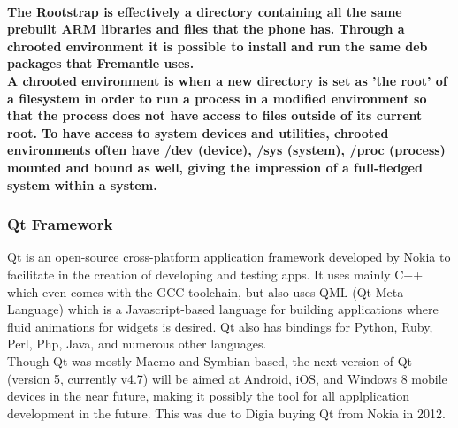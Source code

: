 \documentclass[11pt]{article} %
\begin{document}
\paragraph{The Rootstrap is effectively a directory containing all the same prebuilt ARM libraries and files that the phone has. Through a chrooted environment it is possible to install and run the same deb packages that Fremantle uses. \\A chrooted environment is when a new directory is set as 'the root' of a filesystem in order to run a process in a modified environment so that the process does not have access to files outside of its current root. To have access to system devices and utilities, chrooted environments often have  /dev (device), /sys (system), /proc (process) mounted and bound as well, giving the impression of a full-fledged system within a system.}

\subsubsection{Qt Framework} {
Qt is an open-source cross-platform application framework developed by Nokia to facilitate in the creation of developing and testing apps.  It uses mainly C++ which even comes with the GCC toolchain, but also uses QML (Qt Meta Language) which is a Javascript-based language for building applications where fluid animations for widgets is desired. Qt also has bindings for Python, Ruby, Perl, Php, Java, and numerous other languages.\\

Though Qt was mostly Maemo and Symbian based, the next version of Qt (version 5, currently v4.7) will be aimed at Android, iOS, and Windows 8 mobile devices in the near future, making it possibly the tool for all applplication development in the future. This was due to Digia buying Qt from Nokia in 2012\cite{nokiasell}.
}
\end{document}
